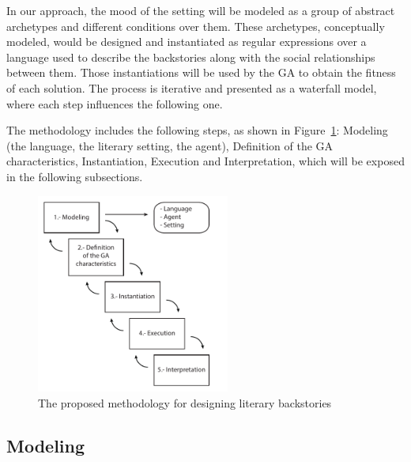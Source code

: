 \documentclass[letterpaper]{article}
\begin{document}
In our approach, the mood of the setting will be modeled as a group of abstract archetypes and different conditions over them. These archetypes, conceptually modeled, would be designed and instantiated as regular expressions over a language used to describe the backstories along with the social relationships between them. Those instantiations will be used by the GA to obtain the fitness of each solution. The process is iterative and presented as a waterfall model, where each step influences the following one.

The methodology includes the following steps, as shown in Figure~\ref{fig:methodology}: Modeling (the language, the literary setting, the agent), Definition of the GA characteristics, Instantiation, Execution and Interpretation, which will be exposed in the following subsections.


\begin{figure}[htb]
\centering
   \includegraphics[width=15pc] {img/methodology.pdf}
\caption{The proposed methodology for designing literary backstories}
\label{fig:methodology}
\end{figure}


\subsection{Modeling}
\end{document}
